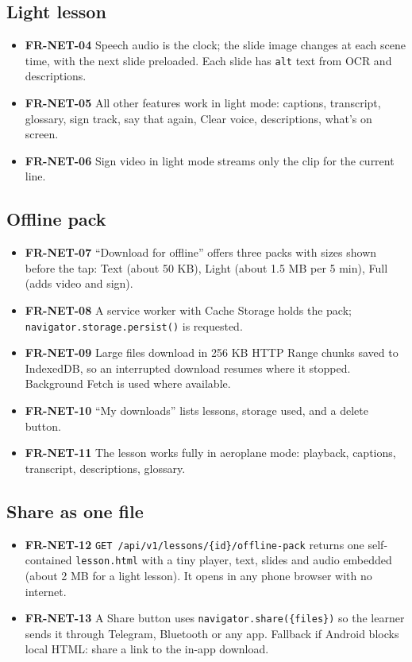 \documentclass[11pt,a4paper]{article}
\newcommand{\code}[1]{\texttt{#1}}
\newcommand{\req}[1]{\textbf{#1}}
\begin{document}
\subsection{Light lesson}
\begin{itemize}
  \item \req{FR-NET-04} Speech audio is the clock; the slide image changes at each scene time, with the next slide preloaded. Each slide has \code{alt} text from OCR and descriptions.
  \item \req{FR-NET-05} All other features work in light mode: captions, transcript, glossary, sign track, say that again, Clear voice, descriptions, what's on screen.
  \item \req{FR-NET-06} Sign video in light mode streams only the clip for the current line.
\end{itemize}

\subsection{Offline pack}
\begin{itemize}
  \item \req{FR-NET-07} ``Download for offline'' offers three packs with sizes shown before the tap: Text (about 50 KB), Light (about 1.5 MB per 5 min), Full (adds video and sign).
  \item \req{FR-NET-08} A service worker with Cache Storage holds the pack; \code{navigator.storage.persist()} is requested.
  \item \req{FR-NET-09} Large files download in 256 KB HTTP Range chunks saved to IndexedDB, so an interrupted download resumes where it stopped. Background Fetch is used where available.
  \item \req{FR-NET-10} ``My downloads'' lists lessons, storage used, and a delete button.
  \item \req{FR-NET-11} The lesson works fully in aeroplane mode: playback, captions, transcript, descriptions, glossary.
\end{itemize}

\subsection{Share as one file}
\begin{itemize}
  \item \req{FR-NET-12} \code{GET /api/v1/lessons/\{id\}/offline-pack} returns one self-contained \code{lesson.html} with a tiny player, text, slides and audio embedded (about 2 MB for a light lesson). It opens in any phone browser with no internet.
  \item \req{FR-NET-13} A Share button uses \code{navigator.share(\{files\})} so the learner sends it through Telegram, Bluetooth or any app. Fallback if Android blocks local HTML: share a link to the in-app download.
\end{itemize}
\end{document}
